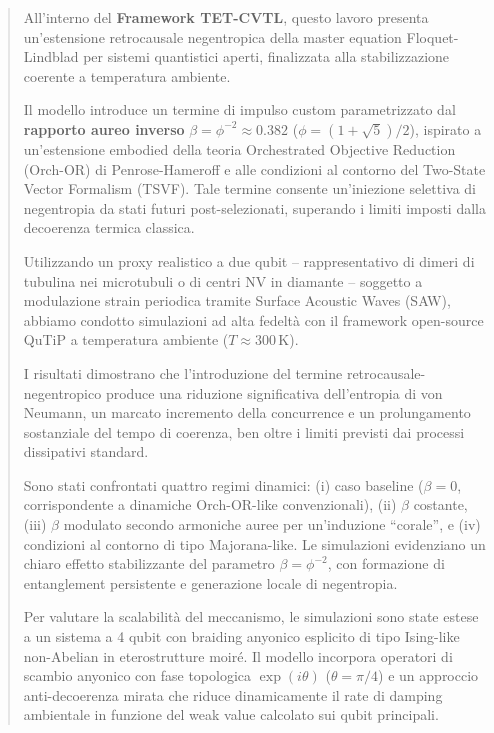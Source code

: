 \documentclass[11pt,a4paper]{article}
\theoremstyle{plain}
\theoremstyle{definition}
\begin{document}
\begin{abstract}
All'interno del \textbf{Framework TET-CVTL}, questo lavoro presenta un'estensione retrocausale negentropica della master equation Floquet-Lindblad per sistemi quantistici aperti, finalizzata alla stabilizzazione coerente a temperatura ambiente. 

Il modello introduce un termine di impulso custom parametrizzato dal \textbf{rapporto aureo inverso} \(\beta = \phi^{-2} \approx 0.382\) (\(\phi = (1 + \sqrt{5})/2\)), ispirato a un'estensione embodied della teoria Orchestrated Objective Reduction (Orch-OR) di Penrose-Hameroff e alle condizioni al contorno del Two-State Vector Formalism (TSVF). Tale termine consente un'iniezione selettiva di negentropia da stati futuri post-selezionati, superando i limiti imposti dalla decoerenza termica classica.


Utilizzando un proxy realistico a due qubit -- rappresentativo di dimeri di tubulina nei microtubuli o di centri NV in diamante -- soggetto a modulazione strain periodica tramite Surface Acoustic Waves (SAW), abbiamo condotto simulazioni ad alta fedeltà con il framework open-source QuTiP a temperatura ambiente (\(T \approx 300\,\text{K}\)). 





I risultati dimostrano che l'introduzione del termine retrocausale-negentropico produce una riduzione significativa dell'entropia di von Neumann, un marcato incremento della concurrence e un prolungamento sostanziale del tempo di coerenza, ben oltre i limiti previsti dai processi dissipativi standard.

Sono stati confrontati quattro regimi dinamici: (i) caso baseline (\(\beta = 0\), corrispondente a dinamiche Orch-OR-like convenzionali), (ii) \(\beta\) costante, (iii) \(\beta\) modulato secondo armoniche auree per un'induzione ``corale'', e (iv) condizioni al contorno di tipo Majorana-like. Le simulazioni evidenziano un chiaro effetto stabilizzante del parametro \(\beta = \phi^{-2}\), con formazione di entanglement persistente e generazione locale di negentropia.

Per valutare la scalabilità del meccanismo, le simulazioni sono state estese a un sistema a 4 qubit con braiding anyonico esplicito di tipo Ising-like non-Abelian in eterostrutture moiré. Il modello incorpora operatori di scambio anyonico con fase topologica \(\exp(i\theta)\) (\(\theta = \pi/4\)) e un approccio anti-decoerenza mirata che riduce dinamicamente il rate di damping ambientale in funzione del weak value calcolato sui qubit principali. 


\end{abstract}
\end{document}
